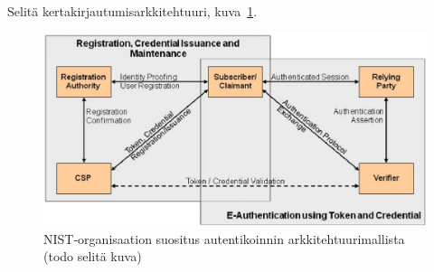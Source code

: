 \documentclass[finnish,gradu]{tktltiki}
\begin{document}
  Selitä kertakirjautumisarkkitehtuuri, kuva~\ref{fig:kertakirjautumisarkkitehtuurin_yleiskuva}.
  \begin{figure}
    \centering
    \includegraphics[width=1.0\textwidth]{images/NIST_authentication_architectural_model.jpg}
    \caption{NIST-organisaation suositus autentikoinnin arkkitehtuurimallista~\cite{NIST_SP800-63-1} (todo selitä kuva) }
    \label{fig:kertakirjautumisarkkitehtuurin_yleiskuva}
  \end{figure}











\end{document}
